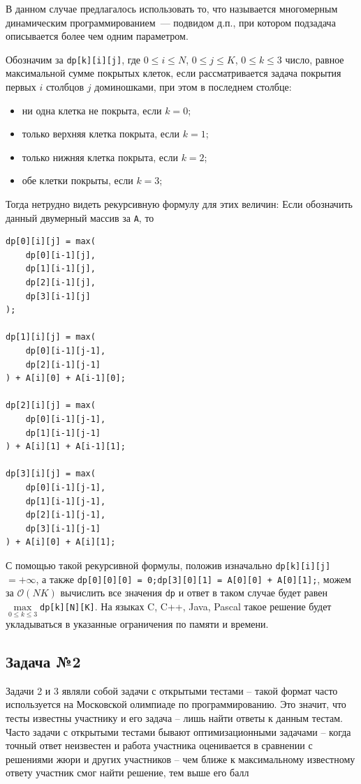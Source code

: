 \documentclass[a4paper]{article}
\begin{document}
В данном случае предлагалось использовать то, что называется многомерным динамическим программированием~--- подвидом д.п., при котором подзадача описывается более чем одним параметром.

Обозначим за \texttt{dp[k][i][j]}, где $0 \leq i \leq N$, $0 \leq j \leq K$, $0 \leq k \leq 3$ число, равное максимальной сумме покрытых клеток, если рассматривается задача покрытия первых $i$ столбцов $j$ доминошками, при этом в последнем столбце:
\begin{itemize} 
    \item ни одна клетка не покрыта, если $k = 0$;
    \item только верхняя клетка покрыта, если $k = 1$;
    \item только нижняя клетка покрыта, если $k = 2$;
    \item обе клетки покрыты, если $k = 3$;
\end{itemize} 

Тогда нетрудно видеть рекурсивную формулу для этих величин: Если обозначить данный двумерный массив за \texttt{A}, то 

\begin{lstlisting}
dp[0][i][j] = max(
    dp[0][i-1][j],
    dp[1][i-1][j],
    dp[2][i-1][j],
    dp[3][i-1][j]
);

dp[1][i][j] = max(
    dp[0][i-1][j-1],
    dp[2][i-1][j-1]
) + A[i][0] + A[i-1][0];

dp[2][i][j] = max(
    dp[0][i-1][j-1],
    dp[1][i-1][j-1]
) + A[i][1] + A[i-1][1];

dp[3][i][j] = max(
    dp[0][i-1][j-1],
    dp[1][i-1][j-1],
    dp[2][i-1][j-1],
    dp[3][i-1][j-1]
) + A[i][0] + A[i][1];
\end{lstlisting}

С помощью такой рекурсивной формулы, положив изначально \texttt{dp[k][i][j]}$=+\infty$, а также     \texttt{dp[0][0][0] = 0;}\texttt{dp[3][0][1] = A[0][0] + A[0][1];}, можем за $\mathcal O(NK)$ вычислить все значения \texttt{dp} и ответ в таком случае будет равен $\max\limits_{0 \leq k \leq 3}$\texttt{dp[k][N][K]}. На языках C, C++, Java, Pascal такое решение будет укладываться в указанные ограничения по памяти и времени.




\newpage
\subsection{Задача №2}
Задачи 2 и 3 являли собой задачи с открытыми тестами -- такой формат часто используется на Московской олимпиаде по программированию. Это значит, что тесты известны участнику и его задача -- лишь найти ответы к данным тестам. Часто задачи с открытыми тестами бывают оптимизационными задачами -- когда точный ответ неизвестен и работа участника оценивается в сравнении с решениями жюри и других участников -- чем ближе к максимальному известному ответу участник смог найти решение, тем выше его балл
\end{document}
